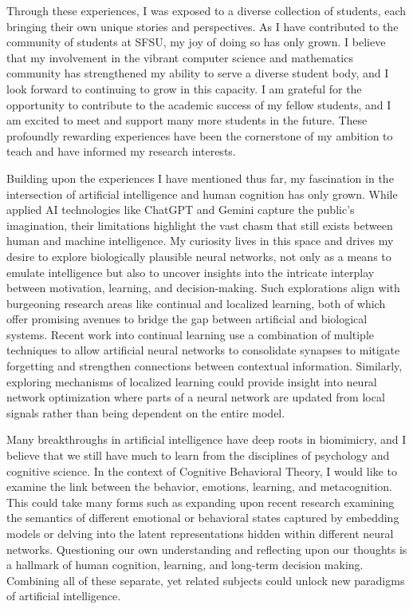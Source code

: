 \documentclass[10pt]{article}
\begin{document}
Through these experiences, I was exposed to a diverse collection of students, each bringing their own unique stories and perspectives.
As I have contributed to the community of students at SFSU, my joy of doing so has only grown.  I believe that my involvement in the vibrant
computer science and mathematics community has strengthened my ability to serve a diverse student body, and I look forward to continuing to
grow in this capacity. I am grateful for the opportunity to contribute to the academic success of my fellow students, and I am excited to
meet and support many more students in the future. These profoundly rewarding experiences have been the cornerstone of my ambition to teach
and have informed my research interests.

Building upon the experiences I have mentioned thus far, my fascination in the intersection of artificial intelligence and human cognition
has only grown. While applied AI technologies like ChatGPT and Gemini capture the public's imagination, their limitations highlight the vast
chasm that still exists between human and machine intelligence. My curiosity lives in this space and drives my desire to explore
biologically plausible neural networks, not only as a means to emulate intelligence but also to uncover insights into the intricate
interplay between motivation, learning, and decision-making. Such explorations align with burgeoning research areas like continual and
localized learning, both of which offer promising avenues to bridge the gap between artificial and biological systems. Recent work into
continual learning use a combination of multiple techniques to allow artificial neural networks to consolidate synapses to mitigate
forgetting and strengthen connections between contextual information. Similarly, exploring mechanisms of localized learning could provide
insight into neural network optimization where parts of a neural network are updated from local signals rather than being dependent on the
entire model.

Many breakthroughs in artificial intelligence have deep roots in biomimicry, and I believe that we still have much to learn from the
disciplines of psychology and cognitive science.  In the context of Cognitive Behavioral Theory, I would like to examine the link between
the behavior, emotions, learning, and metacognition. This could take many forms such as expanding upon recent research examining the
semantics of different emotional or behavioral states captured by embedding models or delving into the latent representations hidden within
different neural networks. Questioning our own understanding and reflecting upon our thoughts is a hallmark of human cognition, learning,
and long-term decision making. Combining all of these separate, yet related subjects could unlock new paradigms of artificial intelligence.
\end{document}
